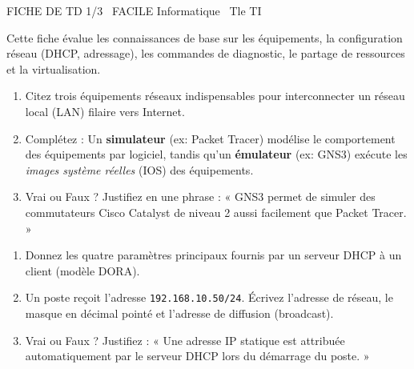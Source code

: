 \documentclass[11pt]{article}
\begin{document}
\begin{tcolorbox}[enhanced,colback=popink,colframe=popink,arc=10pt,boxrule=0pt,left=12pt,right=12pt,top=9pt,bottom=9pt]
{\color{white}\popxbold\small FICHE DE TD 1/3 \textbullet\ FACILE \hfill Informatique \textbullet\ Tle TI\par}
\end{tcolorbox}
\vspace{4pt}
Cette fiche évalue les connaissances de base sur les équipements, la configuration réseau (DHCP, adressage), les commandes de diagnostic, le partage de ressources et la virtualisation.

\begin{exercice}
\begin{enumerate}
    \item Citez trois équipements réseaux indispensables pour interconnecter un réseau local (LAN) filaire vers Internet.
    \item Complétez : Un \textbf{simulateur} (ex: Packet Tracer) modélise le comportement des équipements par logiciel, tandis qu'un \textbf{émulateur} (ex: GNS3) exécute les \textit{images système réelles} (IOS) des équipements.
    \item Vrai ou Faux ? Justifiez en une phrase : « GNS3 permet de simuler des commutateurs Cisco Catalyst de niveau 2 aussi facilement que Packet Tracer. »
\end{enumerate}
\end{exercice}

\begin{exercice}
\begin{enumerate}
    \item Donnez les quatre paramètres principaux fournis par un serveur DHCP à un client (modèle DORA).
    \item Un poste reçoit l'adresse \texttt{192.168.10.50/24}. Écrivez l'adresse de réseau, le masque en décimal pointé et l'adresse de diffusion (broadcast).
    \item Vrai ou Faux ? Justifiez : « Une adresse IP statique est attribuée automatiquement par le serveur DHCP lors du démarrage du poste. »
\end{enumerate}
\end{exercice}
\end{document}

